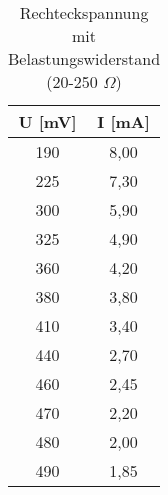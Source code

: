 \begin{table}[h]
	\begin{center}
		\begin{tabular}{cc}
			U [mV]&I [mA] \\ \hline
			190&8,00\\
			225&7,30\\
			300&5,90\\
			325&4,90\\
			360&4,20\\
			380&3,80\\
			410&3,40\\
			440&2,70\\
			460&2,45\\
			470&2,20\\
			480&2,00\\
			490&1,85
		\end{tabular}
		\caption{Rechteckspannung mit Belastungswiderstand (20-250 $\Omega$)}
		\label{tabdr}
	\end{center}
\end{table}